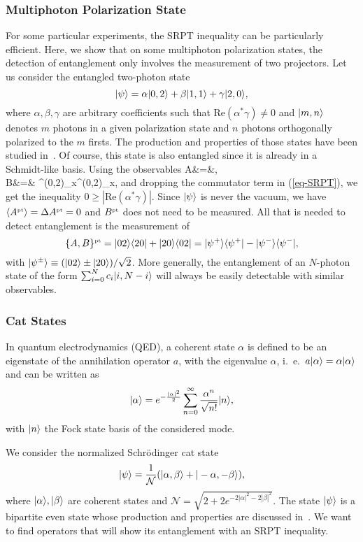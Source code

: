 \subsubsection{Multiphoton Polarization State}

For some particular experiments, the SRPT inequality can be particularly efficient. Here, we show that on some multiphoton polarization states, the detection of entanglement only involves the measurement of two projectors. Let us consider the entangled two-photon state
\[ | \psi \rangle = \alpha | 0,2 \rangle + \beta | 1,1 \rangle + \gamma | 2,0 \rangle, \label{eq-multi} \]
where $\alpha, \beta, \gamma$ are arbitrary coefficients such that $ \mbox{Re}(\alpha^* \gamma)\neq 0$ and $| m,n \rangle$ denotes $m$ photons in a given polarization state and $n$ photons orthogonally polarized to the $m$ firsts. The production and properties of those states have been studied in~\cite{Tse00}.  Of course, this state is also entangled since it is already in a Schmidt-like basis. Using the observables
\bea  A&=&, \\  B&=& \sigma^{(0,2)}_x\otimes\sigma^{(0,2)}_x, \eea
and dropping the commutator term in (\ref{eq-SRPT}), we get the inequality $0 \ge | \mbox{Re}(\alpha^* \gamma)|$. Since $| \psi \rangle$ is never the vacuum, we have $\langle A^{\mbox{\tiny \textup{pt}}} \rangle = \Delta A^{\mbox{\tiny \textup{pt}}} = 0$ and $B^{\mbox{\tiny \textup{pt}}}$ does not need to be measured. All that is needed to detect entanglement is the measurement of
\[ \{A,B\}^{\mbox{\tiny \textup{pt}}}= | 02 \rangle \langle 20 |+| 20 \rangle \langle 02 | = | \psi^+ \rangle \langle \psi^+ |-| \psi^- \rangle \langle \psi^- |, \]
with $| \psi^\pm \rangle\equiv (| 02 \rangle \pm | 20 \rangle)/\sqrt 2$. More generally, the entanglement of an $N$-photon state of the form $\sum_{i=0}^N c_i | i,N-i  \rangle$  will always be easily detectable with similar observables.

\subsubsection{Cat States}

In quantum electrodynamics (QED), a coherent state $\alpha$ is defined to be an eigenstate of the annihilation operator $a$, with the eigenvalue $\alpha$, i.~e.~$a | \alpha \rangle=\alpha| \alpha \rangle$ and can be written as
\[ | \alpha \rangle =e^{-\frac{|\alpha|^2}{2}}\sum_{n=0}^{\infty} \frac{\alpha^n}{\sqrt{n!}} | n \rangle, \]
with $| n \rangle$ the Fock state basis of the considered mode.

We consider the normalized Schr\"odinger cat state
\[ | \psi \rangle= \frac{1}{\mathcal{N}} (| \alpha, \beta \rangle + | -\alpha,-\beta \rangle), \label{eq-cat}\]
where $| \alpha \rangle, | \beta \rangle$ are coherent states and $\mathcal{N}=\sqrt{2+2 e^{-2|\alpha|^2-2|\beta|^2}}$.
The state $| \psi \rangle$ is a bipartite even state whose production and properties are discussed in~\cite{Ger07}. We want to find operators that will show its entanglement with an SRPT inequality.

